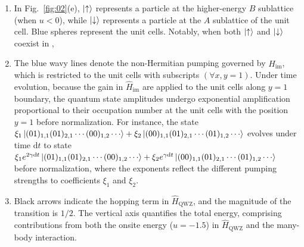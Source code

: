 \documentclass[longbibliography, aps, prx, amsmath, amssymb, amsfonts, twocolumn,superscriptaddress, footinbib]{revtex4-1}
\begin{document}
	\begin{enumerate}
		\item In Fig.~\ref{fig:02}(e), $\ket{\uparrow}$ represents a particle at the higher-energy $B$ sublattice (when $u<0$), while $\ket{\downarrow}$ represents a particle at the $A$ sublattice of the unit cell. 
		Blue spheres represent the unit cells. 
		Notably, when both $\ket{\uparrow}$ and $\ket{\downarrow}$ coexist in {\color{blue}{a unit cell}}, {\color{blue}{it indicates both $A$ and $B$ sublattices are occupied.}}
		\item The blue wavy lines denote the non-Hermitian pumping governed by $\hat{H}_{\text{im}}$, which is restricted to the unit cells with subscripts $(\forall x,y=1)$. Under time evolution, because the gain in $\hat{H}_{\text{im}}$ are applied to the unit cells along $y=1$ boundary, the quantum state amplitudes undergo exponential amplification proportional to their occupation number at the unit cells with the position $y=1$ before normalization. For instance, the state $\xi_1 \ket{(01)_{1,1}(01)_{2,1}\cdots(00)_{1,2}\cdots} + \xi_2\ket{(00)_{1,1}(01)_{2,1}\cdots(01)_{1,2}\cdots}$ evolves under time $\mathrm{d}t$ to state $\xi_1 e^{2\gamma \mathrm{d}t} \ket{(01)_{1,1}(01)_{2,1}\cdots(00)_{1,2}\cdots} + \xi_2 e^{\gamma \mathrm{d}t} \ket{(00)_{1,1}(01)_{2,1}\cdots(01)_{1,2}\cdots}$ before normalization, where the exponents reflect the different pumping strengths to coefficients $\xi_1$ and $\xi_2$. 
		\item Black arrows indicate the hopping term in $\hat{H}_{\text{QWZ}}$, and the magnitude of the transition is $1/2$. The vertical axis quantifies the total energy, comprising contributions from both the onsite energy ($u=-1.5$) in $\hat{H}_{\text{QWZ}}$ and the many-body interaction.
	\end{enumerate}
\end{document}
